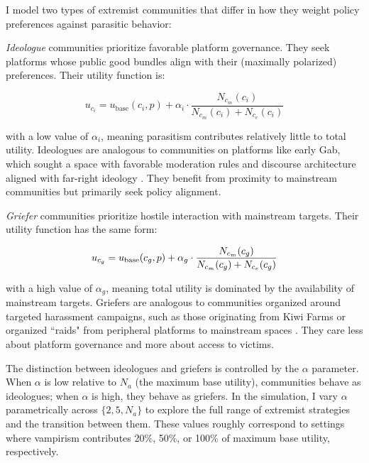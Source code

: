 \documentclass[12pt]{article}
\begin{document}
I model two types of extremist communities that differ in how they weight policy preferences against parasitic behavior:

\textit{Ideologue} communities prioritize favorable platform governance. They seek platforms whose public good bundles align with their (maximally polarized) preferences. Their utility function is:

\begin{equation}
u_{c_i} = u_{\text{base}}(c_i, p) + \alpha_i \cdot \frac{N_{c_m}(c_i)}{N_{c_m}(c_i) + N_{c_e}(c_i)}
\label{eq:ideologue}
\end{equation}

\noindent with a low value of $\alpha_i$, meaning parasitism contributes relatively little to total utility. Ideologues are analogous to communities on platforms like early Gab, which sought a space with favorable moderation rules and discourse architecture aligned with far-right ideology \citep{jasserWelcomeGabFamFarright2023}. They benefit from proximity to mainstream communities but primarily seek policy alignment.

\textit{Griefer} communities prioritize hostile interaction with mainstream targets. Their utility function has the same form:

\begin{equation}
u_{c_g} = u_{\text{base}}(c_g, p) + \alpha_g \cdot \frac{N_{c_m}(c_g)}{N_{c_m}(c_g) + N_{c_e}(c_g)}
\label{eq:griefer}
\noindent 
\end{equation}

\noindent with a high value of $\alpha_g$, meaning total utility is dominated by the availability of mainstream targets. Griefers are analogous to communities organized around targeted harassment campaigns, such as those originating from Kiwi Farms or organized ``raids" from peripheral platforms to mainstream spaces \citep{lavin2020culture, gais2021encrypted}. They care less about platform governance and more about access to victims.

The distinction between ideologues and griefers is controlled by the $\alpha$ parameter. When $\alpha$ is low relative to $N_a$ (the maximum base utility), communities behave as ideologues; when $\alpha$ is high, they behave as griefers. In the simulation, I vary $\alpha$ parametrically across $\{2, 5, N_a\}$ to explore the full range of extremist strategies and the transition between them. These values roughly correspond to settings where vampirism contributes 20\%, 50\%, or 100\% of maximum base utility, respectively.
\end{document}
